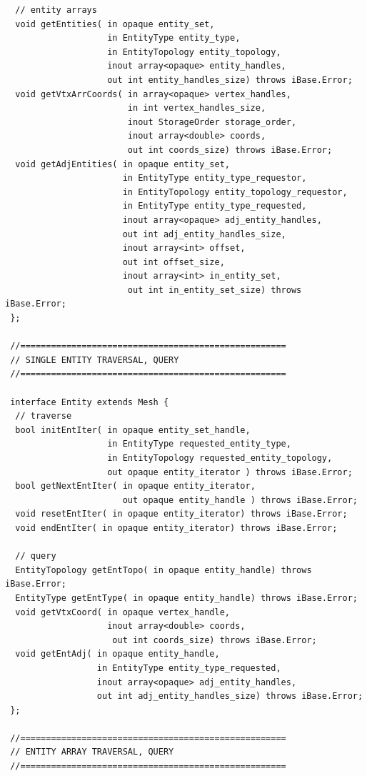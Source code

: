 \documentclass{article}
\begin{document}
\begin{small}
\begin{verbatim}
  // entity arrays 
  void getEntities( in opaque entity_set,  
                    in EntityType entity_type,  
                    in EntityTopology entity_topology, 
                    inout array<opaque> entity_handles, 
                    out int entity_handles_size) throws iBase.Error; 
  void getVtxArrCoords( in array<opaque> vertex_handles, 
                        in int vertex_handles_size, 
                        inout StorageOrder storage_order, 
                        inout array<double> coords, 
                        out int coords_size) throws iBase.Error; 
  void getAdjEntities( in opaque entity_set, 
                       in EntityType entity_type_requestor,  
                       in EntityTopology entity_topology_requestor, 
                       in EntityType entity_type_requested, 
                       inout array<opaque> adj_entity_handles,  
                       out int adj_entity_handles_size, 
                       inout array<int> offset, 
                       out int offset_size, 
                       inout array<int> in_entity_set,  
                        out int in_entity_set_size) throws iBase.Error; 
 };

 //==================================================== 
 // SINGLE ENTITY TRAVERSAL, QUERY 
 //====================================================

 interface Entity extends Mesh { 
  // traverse 
  bool initEntIter( in opaque entity_set_handle, 
                    in EntityType requested_entity_type,  
                    in EntityTopology requested_entity_topology, 
                    out opaque entity_iterator ) throws iBase.Error; 
  bool getNextEntIter( in opaque entity_iterator, 
                       out opaque entity_handle ) throws iBase.Error; 
  void resetEntIter( in opaque entity_iterator) throws iBase.Error; 
  void endEntIter( in opaque entity_iterator) throws iBase.Error; 

  // query 
  EntityTopology getEntTopo( in opaque entity_handle) throws iBase.Error; 
  EntityType getEntType( in opaque entity_handle) throws iBase.Error; 
  void getVtxCoord( in opaque vertex_handle,  
                    inout array<double> coords, 
                     out int coords_size) throws iBase.Error; 
  void getEntAdj( in opaque entity_handle,  
                  in EntityType entity_type_requested,  
                  inout array<opaque> adj_entity_handles,  
                  out int adj_entity_handles_size) throws iBase.Error;  
 };

 //==================================================== 
 // ENTITY ARRAY TRAVERSAL, QUERY 
 //====================================================


\end{verbatim}
\end{small}
\end{document}
